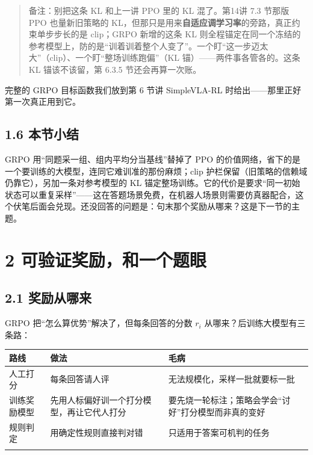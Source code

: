 \documentclass[
  chinese,
]{ctexart}
\begin{document}
\begin{quote}
备注：别把这条 KL 和上一讲 PPO 里的 KL 混了。第14讲 7.3 节那版 PPO
也量新旧策略的
KL，但那只是用来\textbf{自适应调学习率}的旁路，真正约束单步步长的是
clip；GRPO 新增的这条 KL
则全程锚定在同一个冻结的参考模型上，防的是``训着训着整个人变了''。一个盯``这一步迈太大''（clip）、一个盯``整场训练跑偏''（KL
锚）------两件事各管各的。这条 KL 锚该不该留，第 6.3.5
节还会再算一次账。
\end{quote}

完整的 GRPO 目标函数我们放到第 6 节讲 SimpleVLA-RL
时给出------那里正好第一次真正用到它。

\subsection{1.6 本节小结}\label{ux672cux8282ux5c0fux7ed3}

GRPO 用``同题采一组、组内平均分当基线''替掉了 PPO
的价值网络，省下的是一个要训练的大模型，连同它难训准的那份麻烦；clip
护栏保留（旧策略的信赖域仍靠它），另加一条对参考模型的 KL
锚定整场训练。它的代价是要求``同一初始状态可以重复采样''------这在答题场景免费，在机器人场景则需要仿真器配合，这个伏笔后面会兑现。还没回答的问题是：句末那个奖励从哪来？这是下一节的主题。

\section{2
可验证奖励，和一个题眼}\label{ux53efux9a8cux8bc1ux5956ux52b1ux548cux4e00ux4e2aux9898ux773c}

\subsection{2.1 奖励从哪来}\label{ux5956ux52b1ux4eceux54eaux6765}

GRPO 把``怎么算优势''解决了，但每条回答的分数 \(r_i\)
从哪来？后训练大模型有三条路：

\begin{center}
\begin{tabular}{@{}>{\raggedright\arraybackslash}p{} >{\raggedright\arraybackslash}p{} >{\raggedright\arraybackslash}p{}@{}}
\toprule\noalign{}
路线 & 做法 & 毛病 \\
\midrule\noalign{}
人工打分 & 每条回答请人评 & 无法规模化，采样一批就要标一批 \\
训练奖励模型 & 先用人标偏好训一个打分模型，再让它代人打分 & 要先烧一轮标注；策略会学会``讨好''打分模型而非真的变好 \\
规则判定 & 用确定性规则直接判对错 & 只适用于答案可机判的任务 \\
\bottomrule\noalign{}
\end{tabular}
\end{center}
\end{document}

